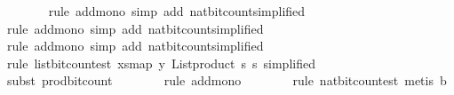 \begin{isabellebody}
\ \ \ \ \ \ \isamarkupfalse%
\ {\isacharparenleft}{\kern0pt}rule\ add{\isacharunderscore}{\kern0pt}mono{\isacharcomma}{\kern0pt}\ simp\ add{\isacharcolon}{\kern0pt}\ nat{\isacharunderscore}{\kern0pt}bit{\isacharunderscore}{\kern0pt}count{\isacharbrackleft}{\kern0pt}simplified{\isacharbrackright}{\kern0pt}{\isacharparenright}{\kern0pt}\isanewline
\ \ \ \ \ \ \isamarkupfalse%
\ {\isacharparenleft}{\kern0pt}rule\ add{\isacharunderscore}{\kern0pt}mono{\isacharcomma}{\kern0pt}\ simp\ add{\isacharcolon}{\kern0pt}\ nat{\isacharunderscore}{\kern0pt}bit{\isacharunderscore}{\kern0pt}count{\isacharbrackleft}{\kern0pt}simplified{\isacharbrackright}{\kern0pt}{\isacharparenright}{\kern0pt}\isanewline
\ \ \ \ \ \ \isamarkupfalse%
\ {\isacharparenleft}{\kern0pt}rule\ add{\isacharunderscore}{\kern0pt}mono{\isacharcomma}{\kern0pt}\ simp\ add{\isacharcolon}{\kern0pt}\ nat{\isacharunderscore}{\kern0pt}bit{\isacharunderscore}{\kern0pt}count{\isacharbrackleft}{\kern0pt}simplified{\isacharbrackright}{\kern0pt}{\isacharparenright}{\kern0pt}\isanewline
\ \ \ \ \ \ \isamarkupfalse%
\ {\isacharparenleft}{\kern0pt}rule\ list{\isacharunderscore}{\kern0pt}bit{\isacharunderscore}{\kern0pt}count{\isacharunderscore}{\kern0pt}est{\isacharbrackleft}{\kern0pt}\ xs{\isacharequal}{\kern0pt}{\isachardoublequoteopen}map\ y\ {\isacharparenleft}{\kern0pt}List{\isachardot}{\kern0pt}product\ {\isacharbrackleft}{\kern0pt}{}{\isachardot}{\kern0pt}{\isachardot}{\kern0pt}{\isacharless}{\kern0pt}s\ {\isacharbrackleft}{\kern0pt}{}{\isachardot}{\kern0pt}{\isachardot}{\kern0pt}{\isacharless}{\kern0pt}s\ simplified{\isacharbrackright}{\kern0pt}{\isacharparenright}{\kern0pt}\isanewline
\ \ \ \ \ \ \isamarkupfalse%
\ {\isacharparenleft}{\kern0pt}subst\ prod{\isacharunderscore}{\kern0pt}bit{\isacharunderscore}{\kern0pt}count{\isacharunderscore}{\kern0pt}{}{\isacharparenright}{\kern0pt}\isanewline
\ \ \ \ \ \ \isamarkupfalse%
\ {\isacharparenleft}{\kern0pt}rule\ add{\isacharunderscore}{\kern0pt}mono{\isacharparenright}{\kern0pt}\isanewline
\ \ \ \ \ \ \isamarkupfalse%
\ {\isacharparenleft}{\kern0pt}rule\ nat{\isacharunderscore}{\kern0pt}bit{\isacharunderscore}{\kern0pt}count{\isacharunderscore}{\kern0pt}est{\isacharcomma}{\kern0pt}\ metis\ b{}{\isacharparenright}{\kern0pt}\isanewline

\end{isabellebody}
